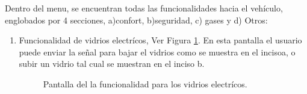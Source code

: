 Dentro del menu, se encuentran todas las funcionalidades hacia el vehículo, englobados  por 4 secciones, a)confort, b)seguridad, c) gases y d) Otros:
 \begin{enumerate}
\item Funcionalidad de vidrios electrícos, Ver Figura \ref{vidrios}. En esta pantalla el usuario puede enviar la señal para bajar el vidrios como se muestra en el incisoa, o subir un vidrio tal cual se muestran en el inciso b.


\begin{figure}[H]
\centering
{}\hspace{5mm}
\hspace{5mm}
\caption{Pantalla del la funcionalidad para los vidrios electrícos.}
\label{vidrios}
\end{figure}


\end{enumerate}
